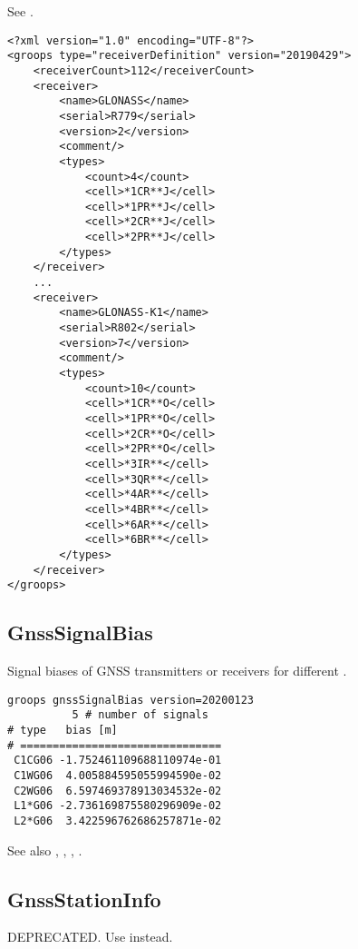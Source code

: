 See .

\begin{verbatim}
<?xml version="1.0" encoding="UTF-8"?>
<groops type="receiverDefinition" version="20190429">
    <receiverCount>112</receiverCount>
    <receiver>
        <name>GLONASS</name>
        <serial>R779</serial>
        <version>2</version>
        <comment/>
        <types>
            <count>4</count>
            <cell>*1CR**J</cell>
            <cell>*1PR**J</cell>
            <cell>*2CR**J</cell>
            <cell>*2PR**J</cell>
        </types>
    </receiver>
    ...
    <receiver>
        <name>GLONASS-K1</name>
        <serial>R802</serial>
        <version>7</version>
        <comment/>
        <types>
            <count>10</count>
            <cell>*1CR**O</cell>
            <cell>*1PR**O</cell>
            <cell>*2CR**O</cell>
            <cell>*2PR**O</cell>
            <cell>*3IR**</cell>
            <cell>*3QR**</cell>
            <cell>*4AR**</cell>
            <cell>*4BR**</cell>
            <cell>*6AR**</cell>
            <cell>*6BR**</cell>
        </types>
    </receiver>
</groops>
\end{verbatim}


\subsection{GnssSignalBias}\label{general.fileFormat:gnssSignalBias}
Signal biases of GNSS transmitters or receivers for different .

\begin{verbatim}
groops gnssSignalBias version=20200123
          5 # number of signals
# type   bias [m]
# ===============================
 C1CG06 -1.752461109688110974e-01
 C1WG06  4.005884595055994590e-02
 C2WG06  6.597469378913034532e-02
 L1*G06 -2.736169875580296909e-02
 L2*G06  3.422596762686257871e-02
 \end{verbatim}

See also , , , .


\subsection{GnssStationInfo}\label{general.fileFormat:gnssStationInfo}
DEPRECATED. Use  instead.


